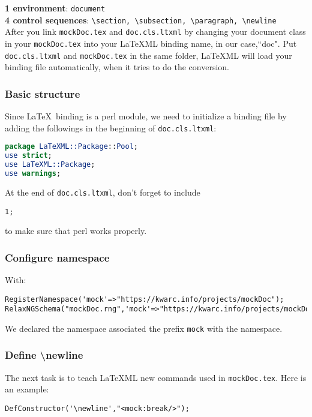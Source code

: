 \documentclass[a4paper]{article}
\begin{document}
\textbf{1 environment}: \texttt{document}\\
\indent \textbf{4 control sequences}: \texttt{\textbackslash section, \textbackslash subsection, \textbackslash paragraph, \textbackslash newline}\\

 After you link \texttt{mockDoc.tex} and \texttt{doc.cls.ltxml} by changing your document class in your \texttt{mockDoc.tex} into your \LaTeX ML binding name, in our case,``doc". Put \texttt{doc.cls.ltxml} and \texttt{mockDoc.tex} in the same folder, \LaTeX ML will load your binding file automatically, when it tries to do the conversion.\\

\subsubsection{Basic structure}
 Since \LaTeX\ binding is a perl module, we need to initialize a binding file by adding the followings in the beginning of \texttt{doc.cls.ltxml}: 
\begin{lstlisting}[language=Perl]
package LaTeXML::Package::Pool;
use strict;
use LaTeXML::Package;
use warnings;
\end{lstlisting}
At the end of \texttt{doc.cls.ltxml}, don't forget to include
\begin{lstlisting}
1;
\end{lstlisting}
to make sure that perl works properly.\\

\subsubsection{Configure namespace}
 With:
\begin{lstlisting}
RegisterNamespace('mock'=>"https://kwarc.info/projects/mockDoc");
RelaxNGSchema("mockDoc.rng",'mock'=>"https://kwarc.info/projects/mockDoc");
\end{lstlisting}
We declared the namespace associated the prefix \texttt{mock} with the namespace.\\

\subsubsection{Define \textbackslash newline}
 The next task is to teach \LaTeX ML new commands used in \texttt{mockDoc.tex}. Here is an example:
\begin{lstlisting}
DefConstructor('\newline',"<mock:break/>");
\end{lstlisting}
\end{document}
